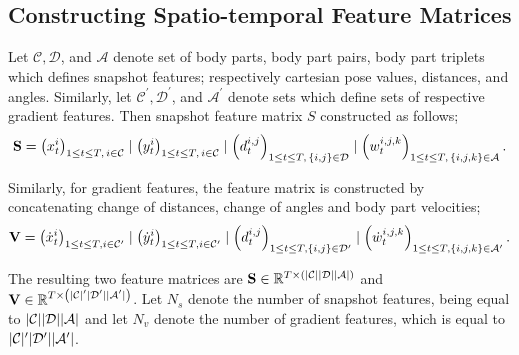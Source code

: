 \subsection{Constructing Spatio-temporal Feature Matrices}
Let $\mathcal{C}, \mathcal{D}$, and $\mathcal{A}$ denote set of body parts, body part pairs, body part triplets which defines snapshot features; respectively cartesian pose values, distances, and angles.
Similarly, let $\mathcal{C}^{\prime}, \mathcal{D}^{\prime}$, and $\mathcal{A}^{\prime}$ denote sets which define sets of respective gradient features.
Then snapshot feature matrix $S$ constructed as follows;
\begin{equation}
	\mathbf{S} = \left(x^i_t\right)_{1 \leq t \leq T, \, i \in \mathcal{C}} \mid \left(y^i_t\right)_{1 \leq t \leq T, \, i \in \mathcal{C}} \mid \left(d^{i,j}_t\right)_{1 \leq t \leq T, \, \left\{i,j\right\} \in \mathcal{D}} \mid \left(w_t^{i,j,k}\right)_{1 \leq t \leq T, \, \left\{i,j,k\right\} \in \mathcal{A}} .
\end{equation}

Similarly, for gradient features, the feature matrix is constructed by concatenating change of distances, change of angles and body part velocities;
\begin{equation}
	\mathbf{V} = \left(\dot{x}^i_t\right)_{1 \leq t \leq T, i \in \mathcal{C}^{\prime}} \mid \left(\dot{y}^i_t\right)_{1 \leq t \leq T, i \in \mathcal{C}^{\prime}} \mid \left(d^{i,j}_t\right)_{1 \leq t \leq T, \left\{i,j\right\} \in \mathcal{D}^{\prime}} \mid \left(\dot{w}_t^{i,j,k}\right)_{1 \leq t \leq T, \left\{i,j,k\right\} \in \mathcal{A}^{\prime}} .
\end{equation}

The resulting two feature matrices are $\mathbf{S} \in \mathbb{R}^{T \times \left(\lvert\mathcal{C}\rvert\lvert\mathcal{D}\rvert\lvert\mathcal{A}\rvert\right)}$ and $\mathbf{V} \in \mathbb{R}^{T \times \left(\lvert\mathcal{C}\rvert^{\prime}\lvert\mathcal{D}^{\prime}\rvert\lvert\mathcal{A}^{\prime}\rvert\right)}$. Let $N_s$ denote the number of snapshot features, being equal to $\lvert\mathcal{C}\rvert\lvert\mathcal{D}\rvert\lvert\mathcal{A}\rvert$ and let $N_v$ denote the number of gradient features, which is equal to $\lvert\mathcal{C}\rvert^{\prime}\lvert\mathcal{D}^{\prime}\rvert\lvert\mathcal{A}^{\prime}\rvert$.

